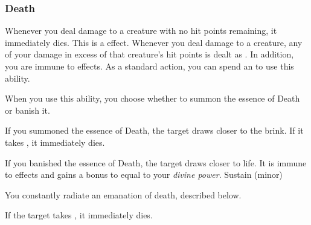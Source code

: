        \subsubsection{Death}
             Whenever you deal damage to a creature with no hit points remaining, it immediately dies.
            This is a  effect.
             Whenever you deal damage to a creature, any of your damage in excess of that creature's hit points is dealt as .
            In addition, you are immune to  effects.
             As a standard action, you can spend an  to use this ability.
            \begin{ability}
                \begin{spelltargetinginfo}
                    \spellspecial When you use this ability, you choose whether to summon the essence of Death or banish it.
                \end{spelltargetinginfo}
                \begin{spelleffects}
                    \spelleffect If you summoned the essence of Death, the target draws closer to the brink.
                    If it takes , it immediately dies.

                    If you banished the essence of Death, the target draws closer to life.
                    It is immune to  effects and gains a bonus to  equal to your \textit{divine power}.
                    \spelldur Sustain (minor)
                \end{spelleffects}
            \end{ability}
             You constantly radiate an emanation of death, described below.
            \begin{ability}
                \begin{spelltargetinginfo}
                \end{spelltargetinginfo}
                \begin{spelleffects}
                    \spelleffect If the target takes , it immediately dies.
                \end{spelleffects}
            \end{ability}

